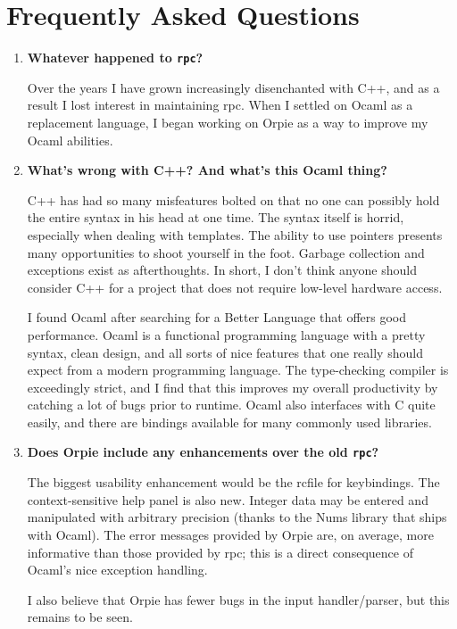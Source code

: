 \documentclass[11pt,notitlepage]{article}
\begin{document}
\section{Frequently Asked Questions}
\begin{enumerate}
   \item {\bf Whatever happened to {\tt rpc}?}

      Over the years I have grown increasingly disenchanted with C++, and
      as a result I lost interest in maintaining rpc.  When I settled on Ocaml
      as a replacement language, I began working on Orpie as a way to improve
      my Ocaml abilities.

   \item {\bf What's wrong with C++?  And what's this Ocaml thing?}

      C++ has had so many misfeatures bolted on that no one can possibly hold
      the entire syntax in his head at one time.  The syntax itself is horrid,
      especially when dealing with templates.  The ability to use pointers
      presents many opportunities to shoot yourself in the foot.
      Garbage collection and exceptions exist as afterthoughts.  In short, I
      don't think anyone should consider C++ for a project that does not require
      low-level hardware access.
     
      I found Ocaml after searching for a Better Language that offers good
      performance.  Ocaml is a functional programming language with a pretty
      syntax, clean design, and all sorts of nice features that one really
      should expect from a modern programming language.  The type-checking 
      compiler is exceedingly strict, and I find that this improves my
      overall productivity by catching a lot of bugs prior to runtime.  Ocaml
      also interfaces with C quite easily, and there are bindings available
      for many commonly used libraries.

   \item {\bf Does Orpie include any enhancements over the old {\tt rpc}?}

      The biggest usability enhancement would be the rcfile for keybindings.
      The context-sensitive help panel is also new.  Integer data may be
      entered and manipulated with arbitrary precision (thanks to the Nums 
      library that ships with Ocaml).  The error messages provided by
      Orpie are, on average, more informative than those provided by rpc;
      this is a direct consequence of Ocaml's nice exception handling.

      I also believe that Orpie has fewer bugs in the input handler/parser,
      but this remains to be seen.
\end{enumerate}
\end{document}
